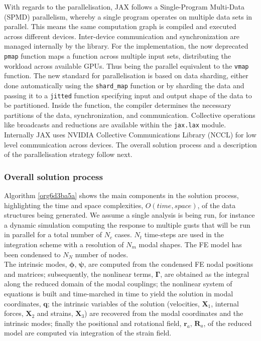 \documentclass[11pt]{article}
\begin{document}
With regards to the parallelisation, JAX follows a Single-Program Multi-Data (SPMD) parallelism, whereby a single program operates on multiple data sets in parallel. This means the same computation graph is compiled and executed across different devices. Inter-device communication and synchronization are managed internally by the library.
For the implementation, the now deprecated \texttt{pmap} function maps a function across multiple input sets, distributing the workload across available GPUs. Thus being the parallel equivalent to the \texttt{vmap} function.
The new standard for parallelisation is based on data sharding, either done automatically using the \texttt{shard\_map} function or by sharding the data and passing it to a \texttt{jitted} function specifying input and output shape of the data to be partitioned. Inside the function, the compiler determines the necessary partitions of the data, synchronization, and communication. Collective operations like broadcasts and reductions are available within the \texttt{jax.lax} module. 
Internally JAX uses NVIDIA Collective Communications Library (NCCL) for low level communication across devices.  
The overall solution process and a description of the parallelisation strategy follow next. 

\subsubsection{Overall solution process}
\label{sec:org096b3c5}
Algorithm \ref{org6d3ba5a} shows the main components in the solution process, highlighting the time and space complexities, \(O(time, space)\), of the data structures being generated. We assume a single analysis is being run, for instance a dynamic simulation computing the response to multiple gusts that will be run in parallel for a total number of \(N_c\) cases. \(N_t\) time-steps are used in the integration scheme with a resolution of \(N_m\) modal shapes. The FE model has been condensed to \(N_N\) number of nodes. 
\\[0pt]
The intrinsic modes, \(\bm{\phi}\), \(\bm{\psi}\), are computed from the condensed FE nodal positions and matrices; subsequently, the nonlinear terms, \(\bm \Gamma\), are obtained as the integral along the reduced domain of the modal couplings; the nonlinear system of equations is built and time-marched in time to yield the solution in modal coordinates, \(\bm q\);
the intrinsic variables of the solution (velocities, \(\bm{X}_1\),  internal forces, \(\bm{X}_{2}\) and strains, \(\bm{X}_{3}\)) are recovered from the modal coordinates and the intrinsic modes; finally the positional and rotational field, \(\bm{r}_a\), \(\bm{R}_{a}\), of the reduced model are computed via integration of the strain field. 
\end{document}
